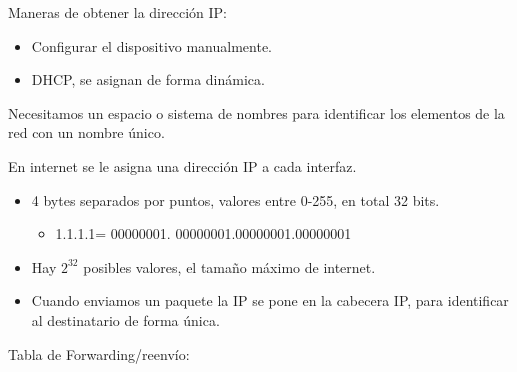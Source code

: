 \documentclass[12pt, twoside, openright]{report} %
\begin{document}
Maneras de obtener la dirección IP:

\begin{itemize}
	\item Configurar el dispositivo manualmente.
	\item DHCP, se asignan de forma dinámica.
\end{itemize}

Necesitamos un espacio o sistema de nombres para identificar los
elementos de la red con un nombre único.

En internet se le asigna una dirección IP a cada interfaz.

\begin{itemize}
	\item 4 bytes separados por puntos, valores entre 0-255, en total 32
	      bits.

	      \begin{itemize}
		      \item 1.1.1.1= 00000001. 00000001.00000001.00000001
	      \end{itemize}
	\item Hay \(2^{32}\) posibles valores, el tamaño máximo de internet.
	\item Cuando enviamos un paquete la IP se pone en la cabecera IP, para
	      identificar al destinatario de forma única.
\end{itemize}

Tabla de Forwarding/reenvío:
\end{document}
